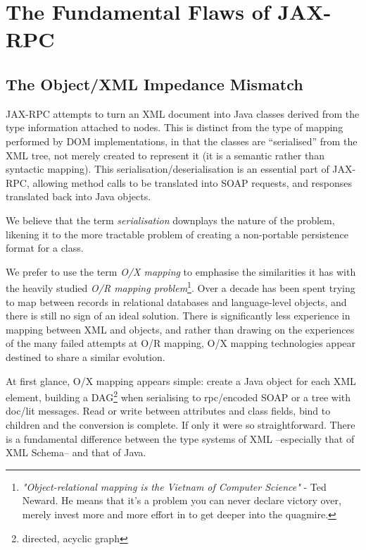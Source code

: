 \section{The Fundamental Flaws of JAX-RPC}
\label{objections}

\subsection{The Object/XML Impedance Mismatch}
\label{objections:o-x}

JAX-RPC attempts to turn an XML document into Java classes derived from the type
information attached to nodes. This is distinct from the type of mapping
performed by DOM implementations, in that the classes are ``serialised'' from
the XML tree, not merely created to represent it (it is a semantic rather than
syntactic mapping). This serialisation/deserialisation is an essential part of
JAX-RPC, allowing method calls to be translated into SOAP requests, and
responses translated back into Java objects.

We believe that the term \emph{serialisation} downplays the nature of
the problem, likening it to the more tractable problem of creating a
non-portable persistence format for a class. 

We prefer to use the term \emph{O/X mapping} to emphasise the
similarities it has with the heavily studied \emph{O/R mapping
problem}\footnote{ \emph{"Object-relational mapping is the Vietnam of
Computer Science"} - Ted Neward. He means that it's a problem you can
never declare victory over, merely invest more and more effort in to
get deeper into the quagmire.
}. 
Over a decade has been spent trying to map between records in relational
databases and language-level objects, and there is still no sign of an ideal
solution. There is significantly less experience in mapping between XML and
objects, and rather than drawing on the experiences of the many failed attempts
at O/R mapping, O/X mapping technologies appear destined to share a similar
evolution.

At first glance, O/X mapping appears simple: create a Java object
for each XML element, building a DAG\footnote{directed, acyclic graph}
when serialising to rpc/encoded SOAP or a tree with doc/lit
messages. Read or write between attributes and class fields, bind to
children and the conversion is complete. If only it were so
straightforward. There is a fundamental difference between the type
systems of XML --especially that of XML Schema-- and that of Java.


